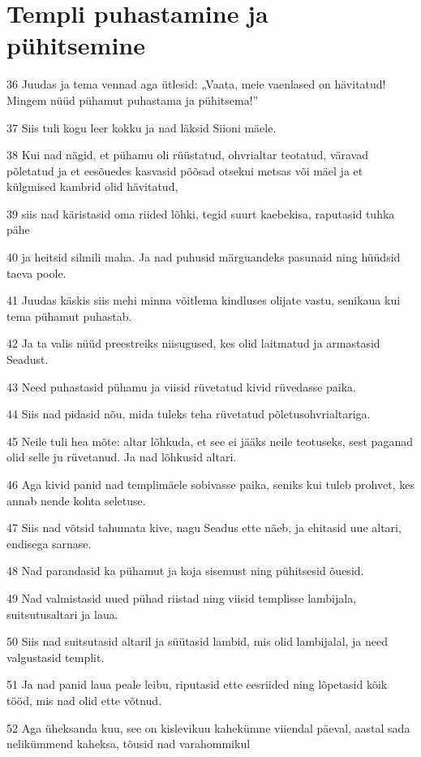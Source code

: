 \section*{Templi puhastamine ja pühitsemine}

\par 36 Juudas ja tema vennad aga ütlesid: „Vaata, meie vaenlased on hävitatud! Mingem nüüd pühamut puhastama ja pühitsema!”
\par 37 Siis tuli kogu leer kokku ja nad läksid Siioni mäele.
\par 38 Kui nad nägid, et pühamu oli rüüstatud, ohvrialtar teotatud, väravad põletatud ja et eesõuedes kasvasid põõsad otsekui metsas või mäel ja et külgmised kambrid olid hävitatud,
\par 39 siis nad käristasid oma riided lõhki, tegid suurt kaebekisa, raputasid tuhka pähe
\par 40 ja heitsid silmili maha. Ja nad puhusid märguandeks pasunaid ning hüüdsid taeva poole.
\par 41 Juudas käskis siis mehi minna võitlema kindluses olijate vastu, senikaua kui tema pühamut puhastab.
\par 42 Ja ta valis nüüd preestreiks niisugused, kes olid laitmatud ja armastasid Seadust.
\par 43 Need puhastasid pühamu ja viisid rüvetatud kivid rüvedasse paika.
\par 44 Siis nad pidasid nõu, mida tuleks teha rüvetatud põletusohvrialtariga.
\par 45 Neile tuli hea mõte: altar lõhkuda, et see ei jääks neile teotuseks, sest paganad olid selle ju rüvetanud. Ja nad lõhkusid altari.
\par 46 Aga kivid panid nad templimäele sobivasse paika, seniks kui tuleb prohvet, kes annab nende kohta seletuse.
\par 47 Siis nad võtsid tahumata kive, nagu Seadus ette näeb, ja ehitasid uue altari, endisega sarnase.
\par 48 Nad parandasid ka pühamut ja koja sisemust ning pühitsesid õuesid.
\par 49 Nad valmistasid uued pühad riistad ning viisid templisse lambijala, suitsutusaltari ja laua.
\par 50 Siis nad suitsutasid altaril ja süütasid lambid, mis olid lambijalal, ja need valgustasid templit.
\par 51 Ja nad panid laua peale leibu, riputasid ette eesriided ning lõpetasid kõik tööd, mis nad olid ette võtnud.
\par 52 Aga üheksanda kuu, see on kislevikuu kahekümne viiendal päeval, aastal sada nelikümmend kaheksa, tõusid nad varahommikul
